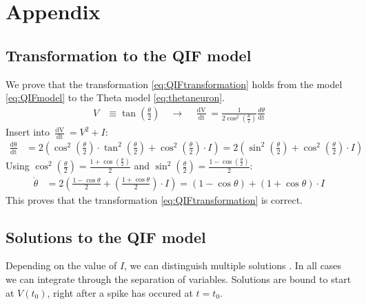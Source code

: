 
\newpage
\appendix
\section{Appendix} \label{sec:Appendix}

\subsection{Transformation to the QIF model} \label{app:TransformationToQIF}
We prove that the transformation \eqref{eq:QIFtransformation} holds from the \QIF model \eqref{eq:QIFmodel} to the Theta model \eqref{eq:thetaneuron}.
\begin{align*}
V &\equiv \tan \left( \frac{\theta}{2} \right) \quad \longrightarrow \quad
\frac{\mathop{d V}}{\mathop{d t}} = \frac{1}{2 \cos ^{2}\left(\frac{\theta}{2}\right)} \frac{d \theta}{ \mathop{d t}}
\end{align*}
Insert into $\frac{\mathop{d V}}{\mathop{d t}}= V^2 + I$:
\begin{align*}
\frac{\mathop{d \theta}}{\mathop{d t}} &= 2\left(\cos ^{2}\left(\frac{\theta}{2}\right) \cdot \tan ^{2}\left(\frac{\theta}{2}\right)+\cos ^{2}\left(\frac{\theta}{2}\right) \cdot I \right) = 2\left(\sin ^{2}\left(\frac{\theta}{2}\right)+\cos ^{2}\left(\frac{\theta}{2}\right) \cdot I \right)
\end{align*}
Using $\cos ^{2}\left(\frac{\theta}{2}\right) = \frac{1+\cos \left(\frac{\theta}{2}\right)}{2}$ and $\sin ^{2}\left(\frac{\theta}{2}\right)=\frac{1-\cos \left(\frac{\theta}{2}\right)}{2}$:
\begin{align*}
\dot{\theta} &=2\left(\frac{1-\cos \theta}{2}+\left(\frac{1+\cos \theta}{2}\right) \cdot I \right) =(1-\cos \theta)+(1+\cos \theta) \cdot I
\end{align*}
This proves that the transformation \eqref{eq:QIFtransformation} is correct.

 
\subsection{Solutions to the QIF model} \label{app:ThetaModelSolutions}
Depending on the value of $I$, we can distinguish multiple solutions  \cite{Perez2020}. In all cases we can integrate through the separation of variables. Solutions are bound to start at $V(t_0)$, right after a spike has occured at $t=t_0$. 

